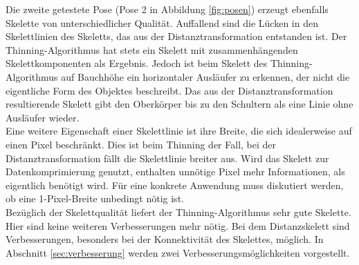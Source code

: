 Die zweite getestete Pose (Pose 2 in Abbildung \ref{fig:posen}) erzeugt ebenfalls Skelette von unterschiedlicher Qualität. Auffallend sind die Lücken in den Skelettlinien des Skeletts, das aus der Distanztransformation entstanden 
ist. Der Thinning-Algorithmus hat stets ein Skelett mit zusammenhängenden Skelettkomponenten als Ergebnis. 
Jedoch ist beim Skelett des Thinning-Algorithmus auf Bauchhöhe ein horizontaler Ausläufer zu erkennen, der nicht die eigentliche Form
des Objektes beschreibt. Das aus der Distanztransformation resultierende Skelett gibt den Oberkörper bis
zu den Schultern als eine Linie ohne Ausläufer wieder.\\
Eine weitere Eigenschaft einer Skelettlinie ist ihre Breite, die sich idealerweise auf einen Pixel beschränkt. Dies ist beim Thinning der Fall, bei der Distanztransformation fällt die Skelettlinie breiter
aus. Wird das Skelett zur Datenkomprimierung genutzt, enthalten unnötige Pixel mehr Informationen, als 
eigentlich benötigt wird. Für eine konkrete Anwendung muss diskutiert werden, ob eine 1-Pixel-Breite unbedingt nötig ist.\\
Bezüglich der Skelettqualität liefert der Thinning-Algorithmus sehr
gute Skelette. Hier sind keine weiteren Verbesserungen mehr nötig.
Bei dem Distanzskelett sind Verbesserungen, besonders bei der 
Konnektivität des Skelettes, möglich. In Abschnitt \ref{sec:verbesserung} werden zwei Verbesserungsmöglichkeiten vorgestellt.
